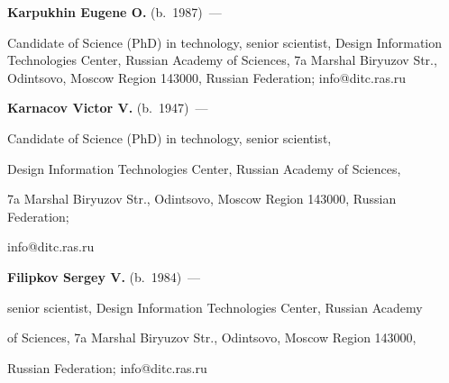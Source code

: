 \noindent


\textbf{Karpukhin Eugene O.} (b.\ 1987)~---


Candidate of Science (PhD) in technology, senior scientist, Design Information Technologies Center, Russian Academy of Sciences, 7a Marshal Biryuzov Str., Odintsovo, Moscow Region  143000, Russian Federation;  info@ditc.ras.ru





\vspace*{3pt}





\noindent


\textbf{Karnacov Victor V.} (b.\ 1947)~---


Candidate of Science (PhD) in technology, senior scientist,


Design Information Technologies Center, Russian Academy of Sciences,


7a Marshal Biryuzov Str., Odintsovo, Moscow Region  143000, Russian Federation;


info@ditc.ras.ru





\vspace*{3pt}





\noindent


\textbf{Filipkov Sergey V.} (b.\ 1984)~---


senior scientist, Design Information Technologies Center, Russian Academy


of Sciences, 7a Marshal Biryuzov Str., Odintsovo, Moscow Region  143000,


Russian Federation; info@ditc.ras.ru














 \label{end\stat}








\renewcommand{\bibname}{\protect\rm Литература}









